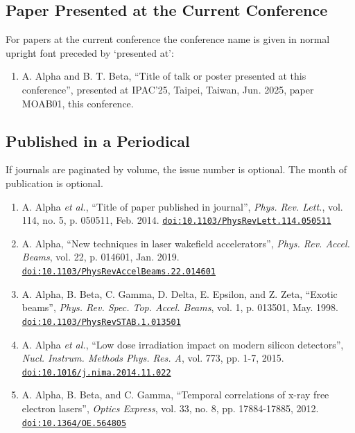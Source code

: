 \documentclass[%
               hyphens,       %
               ]{jacow}
\begin{document}
\subsection{Paper Presented at the Current Conference}

For papers at the current conference the conference name is given in normal upright font preceded by ‘presented at’:
\begin{enumerate}[resume*]\small
	\item  A. Alpha and B. T. Beta, “Title of talk or poster presented at this conference”, 
		presented at IPAC’25, Taipei, Taiwan, Jun. 2025, paper MOAB01, this conference.
\end{enumerate}

\subsection{Published in a Periodical}

If journals are paginated by volume, the issue number is optional. 
The month of publication is optional.

\begin{enumerate}[leftmargin=22pt, resume*]\small
	\item A. Alpha \textit{et al.}, “Title of paper published in journal”, 
		\textit{Phys. Rev. Lett.}, vol. 114, no. 5, p. 050511, Feb. 2014. 
		\href{https//doi.org/10.1103/PhysRevLett.114.050511}{\texttt{doi:10.1103/PhysRevLett.114.050511}}

	\item A. Alpha, “New techniques in laser wakefield accelerators”, 
		\textit{Phys. Rev. Accel. Beams}, vol. 22, p. 014601, Jan. 2019. \\ \href{https//doi.org/10.1103/PhysRevAccelBeams.22.014601}{\texttt{doi:10.1103/PhysRevAccelBeams.22.014601}}

	\item A. Alpha, B. Beta, C. Gamma, D. Delta, E. Epsilon, and Z. Zeta, 
		“Exotic beams”, \textit{Phys. Rev. Spec. Top. Accel. Beams}, vol. 1, p. 013501, May. 1998.	\\ \href{https//doi.org/10.1103/PhysRevSTAB.1.013501}{\texttt{doi:10.1103/PhysRevSTAB.1.013501}}

	\item A. Alpha \textit{et al.}, 
		“Low dose irradiation impact on modern silicon detectors”, 
		\textit{Nucl. Instrum. Methods Phys. Res. A}, vol. 773, pp. 1-7, 2015. \\ \href{https//doi.org/10.1016/j.nima.2014.11.022}{\texttt{doi:10.1016/j.nima.2014.11.022}}

	\item A. Alpha, B. Beta, and C. Gamma, 
		“Temporal correlations of x-ray free electron lasers”, 
		\textit{Optics Express}, vol. 33, no. 8, pp. 17884-17885, 2012. \\
		\href{https//doi.org/10.1364/OE.564805}{\texttt{doi:10.1364/OE.564805}}
\end{enumerate}
\end{document}
